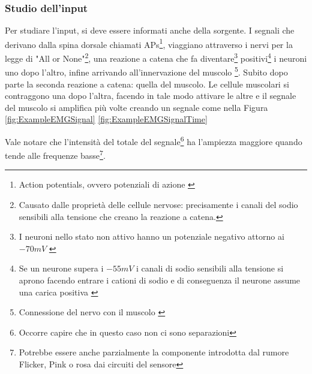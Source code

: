 \documentclass[a4paper, 10pt, final]{article} %
\newcommand{\parenciteit}[2]{\textit{\parencite[#1]{#2}}} %
\begin{document}
    \subsubsection{Studio dell'input}\label{sec:SensorboardDesignInput}
    Per studiare l'input, si deve essere informati anche della sorgente.
    I segnali che derivano dalla spina dorsale chiamati APs\footnote{Action potentials, ovvero potenziali di azione \parenciteit{}{MerlettiMuceli}}, viaggiano attraverso i nervi per la legge di "All or None"\footnote{Causato dalle propriet\`{a} delle cellule nervose: precisamente i canali del sodio \parenciteit{}{SodiumChannel:Wiki} sensibili alla tensione che creano la reazione a catena.}, una reazione a catena che fa diventare\footnote{I neuroni nello stato non attivo hanno un potenziale negativo attorno ai $-70mV$ \parenciteit{}{AP:Wiki}} positivi\footnote{Se un neurone supera i $-55mV$ i canali di sodio sensibili alla tensione si aprono facendo entrare i cationi di sodio e di conseguenza il neurone assume una carica positiva \parenciteit{}{AP:Wiki}} i neuroni uno dopo l'altro, infine arrivando all'innervazione del muscolo \footnote{Connessione del nervo con il muscolo \parenciteit{"NMJ" e "innervation zone" p3}{MerlettiMuceli}}.
    Subito dopo parte la seconda reazione a catena: quella del muscolo.
    Le cellule muscolari si contraggono una dopo l'altra, facendo in tale modo attivare le altre e il segnale del muscolo  si amplifica pi\`{u} volte creando un segnale come nella Figura \ref{fig:ExampleEMGSignal} \ref{fig:ExampleEMGSignalTime}

    Vale notare che l'intensit\`{a} del totale del segnale\footnote{Occorre capire che in questo caso non ci sono separazioni } ha l'ampiezza maggiore quando tende alle frequenze basse\footnote{Potrebbe essere anche parzialmente la componente introdotta dal rumore Flicker, Pink o rosa dai circuiti del sensore}.
\end{document}
